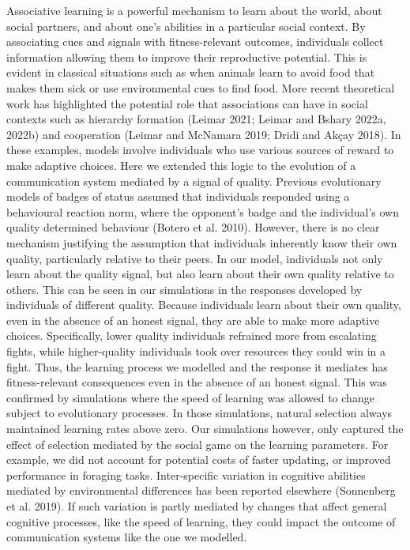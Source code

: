 \documentclass[
  12pt,
]{article}
\begin{document}
Associative learning is a powerful mechanism to learn about the world,
about social partners, and about one's abilities in a particular social
context. By associating cues and signals with fitness-relevant outcomes,
individuals collect information allowing them to improve their
reproductive potential. This is evident in classical situations such as
when animals learn to avoid food that makes them sick or use
environmental cues to find food. More recent theoretical work has
highlighted the potential role that associations can have in social
contexts such as hierarchy formation (Leimar 2021; Leimar and Bshary
2022a, 2022b) and cooperation (Leimar and McNamara 2019; Dridi and Akçay
2018). In these examples, models involve individuals who use various
sources of reward to make adaptive choices. Here we extended this logic
to the evolution of a communication system mediated by a signal of
quality. Previous evolutionary models of badges of status assumed that
individuals responded using a behavioural reaction norm, where the
opponent's badge and the individual's own quality determined behaviour
(Botero et al. 2010). However, there is no clear mechanism justifying
the assumption that individuals inherently know their own quality,
particularly relative to their peers. In our model, individuals not only
learn about the quality signal, but also learn about their own quality
relative to others. This can be seen in our simulations in the responses
developed by individuals of different quality. Because individuals learn
about their own quality, even in the absence of an honest signal, they
are able to make more adaptive choices. Specifically, lower quality
individuals refrained more from escalating fights, while higher-quality
individuals took over resources they could win in a fight. Thus, the
learning process we modelled and the response it mediates has
fitness-relevant consequences even in the absence of an honest signal.
This was confirmed by simulations where the speed of learning was
allowed to change subject to evolutionary processes. In those
simulations, natural selection always maintained learning rates above
zero. Our simulations however, only captured the effect of selection
mediated by the social game on the learning parameters. For example, we
did not account for potential costs of faster updating, or improved
performance in foraging tasks. Inter-specific variation in cognitive
abilities mediated by environmental differences has been reported
elsewhere (Sonnenberg et al. 2019). If such variation is partly mediated
by changes that affect general cognitive processes, like the speed of
learning, they could impact the outcome of communication systems like
the one we modelled.
\end{document}
